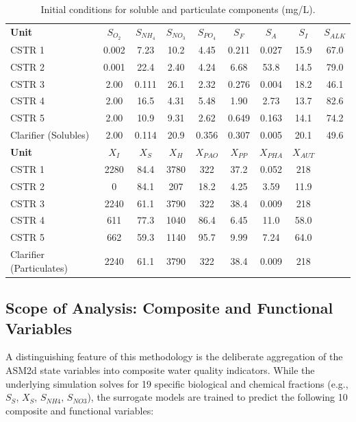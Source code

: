 \documentclass{article}
\begin{document}
\begin{table}[h]
\centering
\caption{Initial conditions for soluble and particulate components (mg/L).}
\label{tab:initial-conditions}
\begin{tabular}{l c c c c c c c c}
\textbf{Unit} & $S_{O_{2}}$ & $S_{NH_{4}}$ & $S_{NO_{3}}$ & $S_{PO_{4}}$ & $S_{F}$ & $S_{A}$ & $S_{I}$ & $S_{ALK}$ \\
CSTR 1 & 0.002 & 7.23 & 10.2 & 4.45 & 0.211 & 0.027 & 15.9 & 67.0 \\
CSTR 2 & 0.001 & 22.4 & 2.40 & 4.24 & 6.68 & 53.8 & 14.5 & 79.0 \\
CSTR 3 & 2.00 & 0.111 & 26.1 & 2.32 & 0.276 & 0.004 & 18.2 & 46.1 \\
CSTR 4 & 2.00 & 16.5 & 4.31 & 5.48 & 1.90 & 2.73 & 13.7 & 82.6 \\
CSTR 5 & 2.00 & 10.9 & 9.31 & 2.62 & 0.649 & 0.163 & 14.1 & 74.2 \\
Clarifier (Solubles) & 2.00 & 0.114 & 20.9 & 0.356 & 0.307 & 0.005 & 20.1 & 49.6 \\
\textbf{Unit} & $X_{I}$ & $X_{S}$ & $X_{H}$ & $X_{PAO}$ & $X_{PP}$ & $X_{PHA}$ & $X_{AUT}$ & \\
CSTR 1 & 2280 & 84.4 & 3780 & 322 & 37.2 & 0.052 & 218 & \\
CSTR 2 & 0 & 84.1 & 207 & 18.2 & 4.25 & 3.59 & 11.9 & \\
CSTR 3 & 2240 & 61.1 & 3790 & 322 & 38.4 & 0.009 & 218 & \\
CSTR 4 & 611 & 77.3 & 1040 & 86.4 & 6.45 & 11.0 & 58.0 & \\
CSTR 5 & 662 & 59.3 & 1140 & 95.7 & 9.99 & 7.24 & 64.0 & \\
Clarifier (Particulates) & 2240 & 61.1 & 3790 & 322 & 38.4 & 0.009 & 218 & \\
\end{tabular}
\end{table}

\subsection{Scope of Analysis: Composite and Functional Variables}
A distinguishing feature of this methodology is the deliberate aggregation of the ASM2d state variables into composite water quality indicators. While the underlying simulation solves for 19 specific biological and chemical fractions (e.g., $S_{S}$, $X_{S}$, $S_{NH4}$, $S_{NO3}$), the surrogate models are trained to predict the following 10 composite and functional variables:
\end{document}
